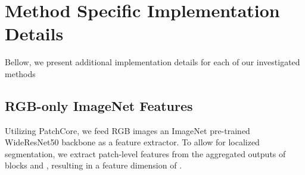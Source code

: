 \documentclass{article}
\begin{document}
\begin{table}[h!]
\begin{center}
\caption{\textbf{\textit{Additional Method Combinations P-ROC Results}}}
\label{table:pixel_rocauc_with_rgb}
\end{center}
\end{table}







\section{Method Specific Implementation Details}
\label{app:method_impl}
Bellow, we present additional implementation details for each of our investigated methods

\subsection{RGB-only ImageNet Features} Utilizing PatchCore, we feed RGB images an ImageNet \cite{imagenet} pre-trained WideResNet50 \cite{wide_resnet_50} backbone as a feature extractor. To allow for localized segmentation, we extract patch-level features from the aggregated outputs of blocks  and , resulting in a feature dimension of . 
\end{document}
